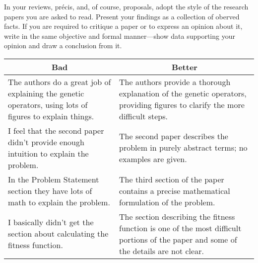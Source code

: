 In your reviews, pr\'{e}cis, and, of course, proposals, adopt the style of
the research papers you are asked to read. Present your findings as a
collection of oberved facts. If you are required to critique a paper
or to express an opinion about it, write in the same objective and formal
manner---show data supporting your opinion and draw a conclusion from it.

\begin{center}
\begin{tabular}{|p{2.5in}|p{2.5in}|}
\hline
\multicolumn{1}{|c|}{\bf Bad} &
\multicolumn{1}{c|}{\bf Better}\\\hline\hline
\begin{minipage}{2.5in}
\smallskip
The authors do a great job of
explaining the genetic operators, using
lots of figures to explain things.
\smallskip
\end{minipage}
&
\begin{minipage}{2.5in}
\smallskip
The authors provide a thorough explanation of
the genetic operators, providing figures to
clarify the more difficult steps.
\smallskip
\end{minipage}
\\\hline
\begin{minipage}{2.5in}
\smallskip
I feel that the second paper didn't provide enough
intuition to explain the problem.
\smallskip
\end{minipage}
&
\begin{minipage}{2.5in}
\smallskip
The second paper describes the problem in purely
abstract terms; no examples are given.
\smallskip
\end{minipage}
\\\hline
\begin{minipage}{2.5in}
\smallskip
In the Problem Statement section they have lots of math to
explain the problem.
\smallskip
\end{minipage}
&
\begin{minipage}{2.5in}
\smallskip
The third section of the paper contains
a  precise mathematical formulation of the problem.
\smallskip
\end{minipage}
\\\hline
\begin{minipage}{2.5in}
\smallskip
I basically didn't get the section about calculating the fitness function.
\smallskip
\end{minipage}
&
\begin{minipage}{2.5in}
\smallskip
The section describing the fitness function is one of the most
difficult portions of the paper and some of the details are not clear.
\smallskip
\end{minipage}
\\\hline
\end{tabular}
\end{center}



